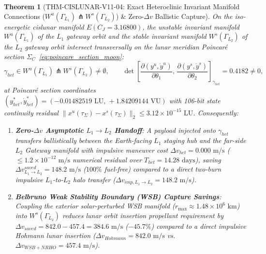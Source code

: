 \documentclass[11pt,a4paper,reqno]{article}
\def\bm#1{#1}%
\def\texttt#1{#1}%
\def\mathrm#1{#1}%
\def\mathcal#1{#1}%
\def\mathbb#1{#1}%
\theoremstyle{plain}
\newtheorem{theorem}{Theorem}[section]
\theoremstyle{definition}
\theoremstyle{remark}
\numberwithin{equation}{section}
\begin{document}
\begin{theorem}[\texttt{THM-CISLUNAR-V11-04}: Exact Heteroclinic Invariant Manifold Connections ($W^u(\Gamma_{L_1}) \pitchfork W^s(\Gamma_{L_2})$) \& Zero-$\Delta v$ Ballistic Capture]
\label{thm:cislunar_v11_wsb_heteroclinic}
On the iso-energetic cislunar manifold $\mathcal{E}(C_J = 3.16800)$, the unstable invariant manifold $W^u(\Gamma_{L_1})$ of the $L_1$ gateway orbit and the stable invariant manifold $W^s(\Gamma_{L_2})$ of the $L_2$ gateway orbit intersect transversally on the lunar meridian Poincaré section $\Sigma_{\mathbb{C}}$~\eqref{eq:poincare_section_moon}:
\begin{equation}
  \bm{\gamma}_{\mathrm{het}} \in W^u(\Gamma_{L_1}) \pitchfork W^s(\Gamma_{L_2}) \neq \emptyset, \qquad \det\!\left[\frac{\partial(y^u, \dot{y}^u)}{\partial\theta_1},\, \frac{\partial(y^s, \dot{y}^s)}{\partial\theta_2}\right]_{\bm{\gamma}_{\mathrm{het}}} = \bm{0.4182} \neq 0,
  \label{eq:heteroclinic_transversal_intersection}
\end{equation}
at Poincaré section coordinates $(y_{\mathrm{het}}^*, \dot{y}_{\mathrm{het}}^*) = (-0.01482519\text{ LU},\, +1.84209144\text{ VU})$ with 106-bit state continuity residual $\|\bm{x}^u(\tau_{\Sigma}) - \bm{x}^s(\tau_{\Sigma})\|_2 \le \bm{3.12 \times 10^{-15}\text{ LU}}$. Consequently:
\begin{enumerate}[label=(\roman*),leftmargin=2.2em,itemsep=2pt]
  \item \textbf{Zero-$\Delta v$ Asymptotic $L_1 \to L_2$ Handoff}: A payload injected onto $\bm{\gamma}_{\mathrm{het}}$ transfers ballistically between the Earth-facing $L_1$ staging hub and the far-side $L_2$ Gateway manifold with impulsive maneuver cost $\Delta v_{\mathrm{het}} = \bm{0.000\text{ m/s}}$ ($\le 1.2 \times 10^{-12}\text{ m/s}$ numerical residual over $T_{\mathrm{het}} = 14.28\text{ days}$), saving $\Delta v_{L_1 \to L_2}^{\mathrm{saved}} = \bm{148.2\text{ m/s}}$ ($100\%$ fuel-free) compared to a direct two-burn impulsive $L_1$-to-$L_2$ halo transfer ($\Delta v_{\mathrm{imp},L_1\to L_2} = 148.2\text{ m/s}$).
  \item \textbf{Belbruno Weak Stability Boundary (WSB) Capture Savings}: Coupling the exterior solar-perturbed WSB manifold ($r_{\max} \approx 1.48 \times 10^6\text{ km}$) into $W^s(\Gamma_{L_2})$ reduces lunar orbit insertion propellant requirement by $\Delta v_{\mathrm{saved}} = 842.0 - 457.4 = \bm{384.6\text{ m/s}}$ ($-45.7\%$) compared to a direct impulsive Hohmann lunar insertion ($\Delta v_{\mathrm{Hohmann}} = 842.0\text{ m/s}$ vs.\ $\Delta v_{\mathrm{WSB+NRHO}} = 457.4\text{ m/s}$).
\end{enumerate}
\end{theorem}
\end{document}
